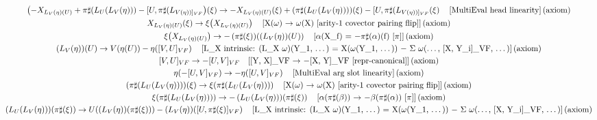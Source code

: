 \documentclass[11pt]{article}
\begin{document}
{\begin{gather*}
\left(-X_{L_V(\eta)(U)} + \pi\sharp\!\left(L_U\!\left(L_V\!\left(\eta\right)\right)\right) - [U,\pi\sharp(L_{V(\eta))]_{VF}}\right)\!\left(\xi\right) \to -X_{L_V(\eta)(U)}\!\left(\xi\right) + \left(\pi\sharp\!\left(L_U\!\left(L_V\!\left(\eta\right)\right)\right)\right)\!\left(\xi\right) - [U,\pi\sharp(L_{V(\eta))]_{VF}}\!\left(\xi\right) \quad \text{[MultiEval head linearity]\,(axiom)} \\
X_{L_V(\eta)(U)}\!\left(\xi\right) \to \xi\!\left(X_{L_V(\eta)(U)}\right) \quad \text{[X(\ensuremath{\omega}) \ensuremath{\to} \ensuremath{\omega}(X)  [arity-1 covector pairing flip]]\,(axiom)} \\
\xi\!\left(X_{L_V(\eta)(U)}\right) \to -\left(\pi\sharp\!\left(\xi\right)\right)\!\left(\left(L_V\!\left(\eta\right)\right)\!\left(U\right)\right) \quad \text{[\ensuremath{\alpha}(X\_f) = \ensuremath{-}\ensuremath{\pi}\ensuremath{\sharp}(\ensuremath{\alpha})(f) [\ensuremath{\pi}]]\,(axiom)} \\
\left(L_V\!\left(\eta\right)\right)\!\left(U\right) \to V\!\left(\eta\!\left(U\right)\right) - \eta\!\left([V,U]_{VF}\right) \quad \text{[L\_X intrinsic: (L\_X \ensuremath{\omega})(Y\_1, \ensuremath{\dots}) = X(\ensuremath{\omega}(Y\_1, \ensuremath{\dots})) \ensuremath{-} \ensuremath{\Sigma} \ensuremath{\omega}(\ensuremath{\dots}, [X, Y\_i]\_VF, \ensuremath{\dots})]\,(axiom)} \\
[V,U]_{VF} \to -[U,V]_{VF} \quad \text{[[Y, X]\_VF \ensuremath{\to} \ensuremath{-}[X, Y]\_VF  [repr-canonical]]\,(axiom)} \\
\eta\!\left(-[U,V]_{VF}\right) \to -\eta\!\left([U,V]_{VF}\right) \quad \text{[MultiEval arg slot linearity]\,(axiom)} \\
\left(\pi\sharp\!\left(L_U\!\left(L_V\!\left(\eta\right)\right)\right)\right)\!\left(\xi\right) \to \xi\!\left(\pi\sharp\!\left(L_U\!\left(L_V\!\left(\eta\right)\right)\right)\right) \quad \text{[X(\ensuremath{\omega}) \ensuremath{\to} \ensuremath{\omega}(X)  [arity-1 covector pairing flip]]\,(axiom)} \\
\xi\!\left(\pi\sharp\!\left(L_U\!\left(L_V\!\left(\eta\right)\right)\right)\right) \to -\left(L_U\!\left(L_V\!\left(\eta\right)\right)\right)\!\left(\pi\sharp\!\left(\xi\right)\right) \quad \text{[\ensuremath{\alpha}(\ensuremath{\pi}\ensuremath{\sharp}(\ensuremath{\beta})) \ensuremath{\to} \ensuremath{-}\ensuremath{\beta}(\ensuremath{\pi}\ensuremath{\sharp}(\ensuremath{\alpha})) [\ensuremath{\pi}]]\,(axiom)} \\
\left(L_U\!\left(L_V\!\left(\eta\right)\right)\right)\!\left(\pi\sharp\!\left(\xi\right)\right) \to U\!\left(\left(L_V\!\left(\eta\right)\right)\!\left(\pi\sharp\!\left(\xi\right)\right)\right) - \left(L_V\!\left(\eta\right)\right)\!\left([U,\pi\sharp(\xi)]_{VF}\right) \quad \text{[L\_X intrinsic: (L\_X \ensuremath{\omega})(Y\_1, \ensuremath{\dots}) = X(\ensuremath{\omega}(Y\_1, \ensuremath{\dots})) \ensuremath{-} \ensuremath{\Sigma} \ensuremath{\omega}(\ensuremath{\dots}, [X, Y\_i]\_VF, \ensuremath{\dots})]\,(axiom)} \\

\end{gather*}}
\end{document}
